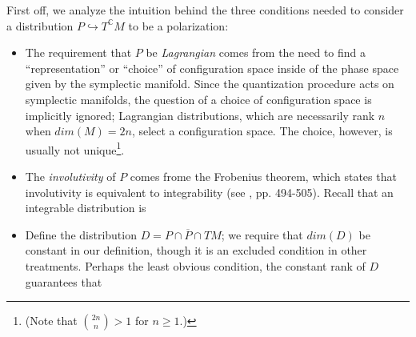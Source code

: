 \documentclass{tufte-handout}
\begin{document}
First off, we analyze the intuition behind the three conditions needed to consider a distribution $P \hookrightarrow T^\mathbb{C}M$ to be a polarization:
\begin{itemize}
\item The requirement that $P$ be \emph{Lagrangian} comes from the need to find a ``representation'' or ``choice'' of configuration space inside of the phase space given by the symplectic manifold. Since the quantization procedure acts on symplectic manifolds, the question of a choice of configuration space is implicitly ignored; Lagrangian distributions, which are necessarily rank $n$ when $dim(M) = 2n$, select a configuration space. The choice, however, is usually not unique\footnote{(Note that ${2n \choose n} > 1$ for $n \geq 1$.)}.

\item The \emph{involutivity} of $P$ comes frome the Frobenius theorem, which states that involutivity is equivalent to integrability (see \cite{lee}, pp. 494-505). Recall that an integrable distribution is %

\item Define the distribution $D = P \cap \overline{P} \cap TM$; we require that $dim(D)$ be constant in our definition, though it is an excluded condition in other treatments. Perhaps the least obvious condition, the constant rank of $D$ guarantees that %
\end{itemize}
















\end{document}
